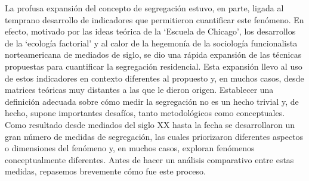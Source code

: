 \documentclass[
  spanish,
  a4paper,%
  chapterprefix=true,%
  DIV=calc,%
  twoside]{scrbook}%
\begin{document}
La profusa expansión del concepto de segregación estuvo, en parte,
ligada al temprano desarrollo de indicadores que permitieron cuantificar
este fenómeno. En efecto, motivado por las ideas teórica de la `Escuela
de Chicago', los desarrollos de la `ecología factorial' y al calor de la
hegemonía de la sociología funcionalista norteamericana de mediados de
siglo, se dio una rápida expansión de las técnicas propuestas para
cuantificar la segregación residencial. Esta expansión llevo al uso de
estos indicadores en contexto diferentes al propuesto y, en muchos
casos, desde matrices teóricas muy distantes a las que le dieron origen.
Establecer una definición adecuada sobre cómo medir la segregación no es
un hecho trivial y, de hecho, supone importantes desafíos, tanto
metodológicos como conceptuales. Como resultado desde mediados del siglo
XX hasta la fecha se desarrollaron un gran número de medidas de
segregación, las cuales priorizaron diferentes aspectos o dimensiones
del fenómeno y, en muchos casos, exploran fenómenos conceptualmente
diferentes. Antes de hacer un análisis comparativo entre estas medidas,
repasemos brevemente cómo fue este proceso.
\end{document}
